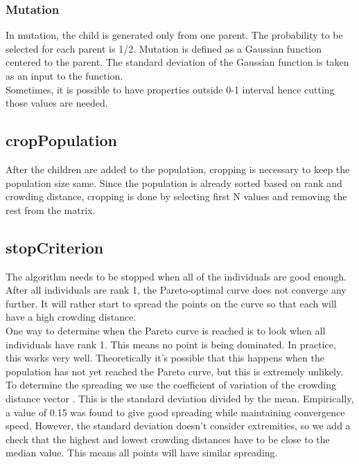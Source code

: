 \subsubsection{Mutation}

In mutation, the child is generated only from one parent. The probability to be selected for each parent is 1/2. Mutation is defined as a Gaussian function centered to the parent. The standard deviation of the Gaussian function is taken as an input to the function.\\

Sometimes, it is possible to have properties outside 0-1 interval hence cutting those values are needed.

\subsection{cropPopulation} \label{cropPopulation}

After the children are added to the population, cropping is necessary to keep the population size same. Since the population is already sorted based on rank and crowding distance, cropping is done by selecting first N values and removing the rest from the matrix. 

\subsection{stopCriterion} \label{stopCriterion}

The algorithm needs to be stopped when all of the individuals are good enough. After all individuals are rank 1, the Pareto-optimal curve does not converge any further. It will rather start to spread the points on the curve so that each will have a high crowding distance. \\
One way to determine when the Pareto curve is reached is to look when all individuals have rank 1. This means no point is being dominated. In practice, this works very well. Theoretically it's possible that this happens when the population has not yet reached the Pareto curve, but this is extremely unlikely.
To determine the spreading we use the coefficient of variation of the crowding distance vector \cite{CV}. This is the standard deviation divided by the mean. Empirically, a value of 0.15 was found to give good spreading while maintaining convergence speed. However, the standard deviation doesn't consider extremities, so we add a check that the highest and lowest crowding distances have to be close to the median value. This means all points will have similar spreading.

